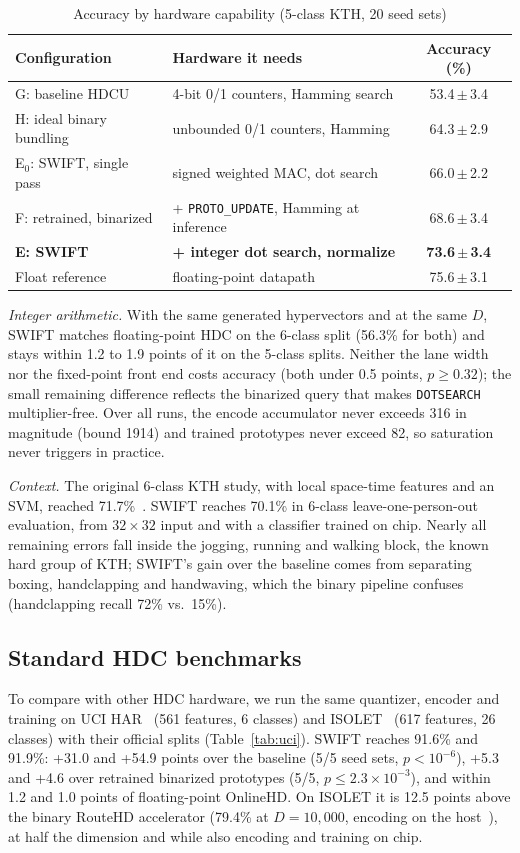 \documentclass[conference]{IEEEtran}
\begin{document}
\begin{table}[t]
\caption{Accuracy by hardware capability (5-class KTH, 20 seed sets)}
\label{tab:decomp}
\centering\scriptsize
\setlength{\tabcolsep}{3pt}
\begin{tabular}{@{}llc@{}}
\toprule
Configuration & Hardware it needs & Accuracy (\%) \\
\midrule
G: baseline HDCU & 4-bit 0/1 counters, Hamming search & 53.4\,$\pm$\,3.4 \\
H: ideal binary bundling & unbounded 0/1 counters, Hamming & 64.3\,$\pm$\,2.9 \\
E$_0$: SWIFT, single pass & signed weighted MAC, dot search & 66.0\,$\pm$\,2.2 \\
F: retrained, binarized & + \texttt{PROTO\_UPDATE}, Hamming at inference & 68.6\,$\pm$\,3.4 \\
\textbf{E: SWIFT} & \textbf{+ integer dot search, normalize} & \textbf{73.6\,$\pm$\,3.4} \\
Float reference & floating-point datapath & 75.6\,$\pm$\,3.1 \\
\bottomrule
\end{tabular}
\end{table}

\emph{Integer arithmetic.} With the same generated hypervectors and at the same $D$, SWIFT matches floating-point HDC on the 6-class split (56.3\% for both) and stays within 1.2 to 1.9 points of it on the 5-class splits. Neither the lane width nor the fixed-point front end costs accuracy (both under 0.5 points, $p\ge0.32$); the small remaining difference reflects the binarized query that makes \texttt{DOTSEARCH} multiplier-free. Over all runs, the encode accumulator never exceeds 316 in magnitude (bound 1914) and trained prototypes never exceed 82, so saturation never triggers in practice.

\emph{Context.} The original 6-class KTH study, with local space-time features and an SVM, reached 71.7\%~\cite{schuldt2004}. SWIFT reaches 70.1\% in 6-class leave-one-person-out evaluation, from $32{\times}32$ input and with a classifier trained on chip. Nearly all remaining errors fall inside the jogging, running and walking block, the known hard group of KTH; SWIFT's gain over the baseline comes from separating boxing, handclapping and handwaving, which the binary pipeline confuses (handclapping recall 72\% vs.\ 15\%).

\subsection{Standard HDC benchmarks}
To compare with other HDC hardware, we run the same quantizer, encoder and training on UCI HAR~\cite{ucihar} (561 features, 6 classes) and ISOLET~\cite{isolet} (617 features, 26 classes) with their official splits (Table~\ref{tab:uci}). SWIFT reaches 91.6\% and 91.9\%: +31.0 and +54.9 points over the baseline (5/5 seed sets, $p<10^{-6}$), +5.3 and +4.6 over retrained binarized prototypes (5/5, $p\le2.3\times10^{-3}$), and within 1.2 and 1.0 points of floating-point OnlineHD.
On ISOLET it is 12.5 points above the binary RouteHD accelerator (79.4\% at $D{=}10{,}000$, encoding on the host~\cite{sahruri2026routehd}), at half the dimension and while also encoding and training on chip.
\end{document}
